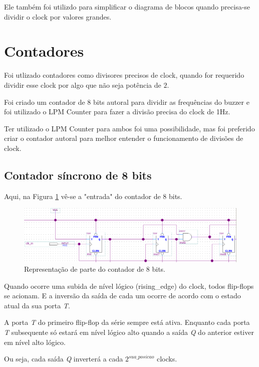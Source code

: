 Ele também foi utilizdo para simplificar o diagrama de blocos quando precisa-se dividir o clock por valores grandes.



\section{Contadores}

Foi utlizado contadores como divisores precisos de clock, quando for requerido dividir esse clock por algo que não seja potência de $2$.

Foi criado um contador de 8 bits autoral para dividir as frequências do buzzer e foi utilizado o LPM Counter para fazer a divisão precisa do clock de 1Hz.


Ter utilizado o LPM Counter para ambos foi uma possibilidade, mas foi preferido criar o contador autoral para melhor entender o funcionamento de divisões de clock.

\subsection{Contador síncrono de 8 bits}

Aqui, na Figura \ref{fig:2.7} vê-se a "entrada" do contador de 8 bits.

\begin{figure}[H]
	\centering
	\includegraphics[width=1\columnwidth]{FIGURAS/cap_2/contador_8bits.png}
	\caption{Representação de parte do contador de 8 bits.}
        \label{fig:2.7}
\end{figure}



Quando ocorre uma subida de nível lógico (rising\_edge) do clock, todos flip-flops se acionam. E a inversão da saída de cada um ocorre de acordo com o estado atual da sua porta \emph{T}.

A porta \emph{T} do primeiro flip-flop da série sempre está ativa. Enquanto cada porta \emph{T} subsequente só estará em nível lógico alto quando a saída \emph{Q} do anterior estiver em nível alto lógico.

Ou seja, cada saída \emph{Q} inverterá a cada $2 ^ {sua\_posicao}$ clocks.

